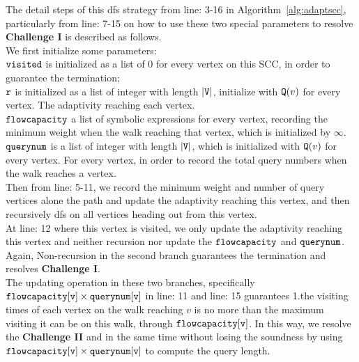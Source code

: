 The detail steps of this dfs strategy
from line: 3-16 in Algorithm~\ref{alg:adaptscc},
particularly from line: 7-15 on how to 
use these two special parameters to resolve \textbf{Challenge I}
 is described as follows.
\\
We first initialize some parameters:
\\
$\mathtt{visited}$ is initialized as a list of $0$ for every vertex on this SCC, in order to guarantee the termination;
\\ 
$\mathtt{r}$ is initialized  as a list of integer with length $|\mathtt{V}|$, initialize with $\mathtt{Q}(v)$ for every vertex. The adaptivity reaching each vertex.
\\ 
$\mathtt{flowcapacity}$ a list of symbolic expressions for every vertex, recording the minimum weight when the walk reaching that vertex, which  is initialized by $\infty$.
\\ 
$\mathtt{querynum}$ is a list of integer with length $|\mathtt{V}|$, which is initialized with $\mathtt{Q}(v)$ for every vertex. 
For every vertex, 
in order to record the total query numbers when the walk reaches a vertex.
\\
Then from line: 5-11, we record the minimum weight and number of query vertices alone the path and update the adaptivity reaching 
this vertex, and then recursively dfs on all vertices heading out from this vertex.
\\
At line: 12 where this vertex is visited, 
we only update the adaptivity reaching this vertex and neither recursion nor update the $\mathtt{flowcapacity}$  and 
$\mathtt{querynum}$.
\\
Again, Non-recursion in the second branch
guarantees the termination and resolves \textbf{Challenge I}.
\\
The updating operation in these two branches, 
specifically $\mathtt{flowcapacity[v] \times querynum[v]}$ in line: 11 and line: 15 
guarantees 
1.the visiting times of each vertex on the walk reaching $v$ is no more than 
the maximum visiting it can be on this walk, through $\mathtt{flowcapacity[v]}$. 
In this way, we resolve the \textbf{Challenge II} and in the same time without losing the soundness 
by using $\mathtt{flowcapacity[v] \times querynum[v]}$ to compute the query length. 
